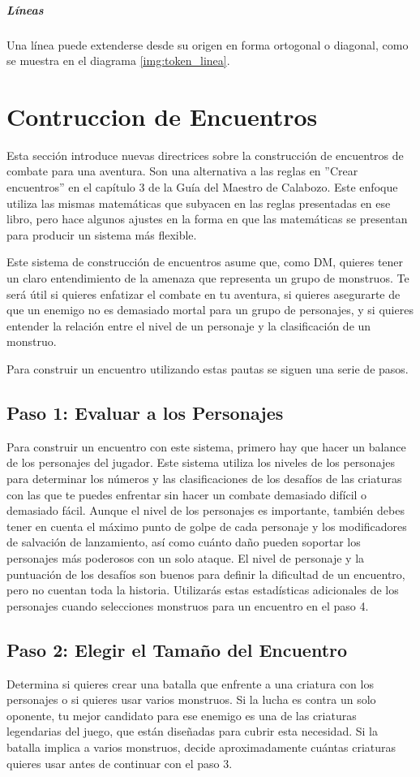 \documentclass[a4paper,twocolumn,openany,10pt]{dndbook}
\begin{document}
\subparagraph{Líneas} Una línea puede extenderse desde su origen en forma ortogonal o diagonal, como se muestra en el diagrama
\ref{img:token_linea}. 

\section{Contruccion de Encuentros}
Esta sección introduce nuevas directrices sobre la construcción de encuentros de combate para una aventura. Son una alternativa a
las reglas en ''Crear encuentros'' en el capítulo 3 de la Guía del Maestro de Calabozo. Este enfoque utiliza las mismas
matemáticas que subyacen en las reglas presentadas en ese libro, pero hace algunos ajustes en la forma en que las matemáticas se
presentan para producir un sistema más flexible.

Este sistema de construcción de encuentros asume que, como DM, quieres tener un claro entendimiento de la amenaza que representa
un grupo de monstruos. Te será útil si quieres enfatizar el combate en tu aventura, si quieres asegurarte de que un enemigo no es
demasiado mortal para un grupo de personajes, y si quieres entender la relación entre el nivel de un personaje y la clasificación
de un monstruo.

Para construir un encuentro utilizando estas pautas se siguen una serie de pasos. 

\subsection*{Paso 1: Evaluar a los Personajes}
Para construir un encuentro con este sistema, primero hay que hacer un balance de los personajes del jugador. Este sistema
utiliza los niveles de los personajes para determinar los números y las clasificaciones de los desafíos de las criaturas con las
que te puedes enfrentar sin hacer un combate demasiado difícil o demasiado fácil. Aunque el nivel de los personajes es importante,
también debes tener en cuenta el máximo punto de golpe de cada personaje y los modificadores de salvación de lanzamiento, así
como cuánto daño pueden soportar los personajes más poderosos con un solo ataque. El nivel de personaje y la puntuación de los
desafíos son buenos para definir la dificultad de un encuentro, pero no cuentan toda la historia. Utilizarás estas estadísticas
adicionales de los personajes cuando selecciones monstruos para un encuentro en el paso 4. 

\subsection*{Paso 2: Elegir el Tamaño del Encuentro}
Determina si quieres crear una batalla que enfrente a una criatura con los personajes o si quieres usar varios monstruos. Si la
lucha es contra un solo oponente, tu mejor candidato para ese enemigo es una de las criaturas legendarias del juego, que están
diseñadas para cubrir esta necesidad. Si la batalla implica a varios monstruos, decide aproximadamente cuántas criaturas quieres
usar antes de continuar con el paso 3.
\end{document}
